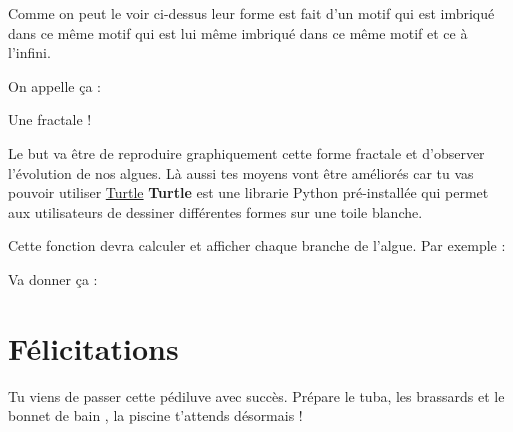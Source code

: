 \documentclass[a4paper, 12pt]{article}
\begin{document}
{    
    
    Comme on peut le voir ci-dessus leur forme est fait d'un motif qui est imbriqué dans ce même motif qui est
    lui même imbriqué dans ce même motif et ce à l'infini.
    
    \vspace{3cm}

    On appelle ça :
    \begin{center}
        {\huge Une fractale !}
    \end{center}
    \vspace{0.5cm}


    Le but va être de reproduire graphiquement cette forme fractale et d'observer l'évolution de nos algues.
    Là aussi tes moyens vont être améliorés car tu vas pouvoir utiliser \href{https://docs.python.org/fr/3/library/turtle.html}{Turtle}
    \newline \newline
    \textbf{Turtle} est une librarie Python pré-installée qui permet aux utilisateurs de dessiner différentes formes sur une toile blanche.



    Cette fonction devra calculer et afficher chaque branche de l'algue.
    \newline \newline
    Par exemple :

    Va donner ça :


}

\vspace{5cm}

\section{Félicitations}

{\comfortaa
    Tu viens de passer cette pédiluve avec succès. Prépare le tuba, les brassards et le bonnet de bain
    , la piscine t'attends désormais !

}
\end{document}

